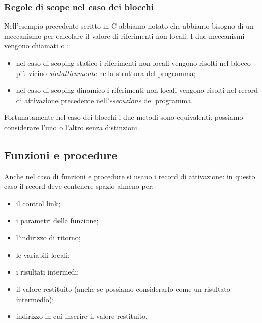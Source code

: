 \subsubsection*{Regole di scope nel caso dei blocchi}

Nell'esempio precedente scritto in C abbiamo notato che abbiamo bisogno di un meccanismo per calcolare il valore di riferimenti non locali. I due meccanismi vengono chiamati  o :
\begin{itemize}
    \item nel caso di scoping statico i riferimenti non locali vengono risolti nel blocco più vicino \emph{sintatticamente} nella struttura del programma;
    \item nel caso di scoping dinamico i riferimenti non locali vengono risolti nel record di attivazione precedente nell'\emph{esecuzione} del programma.
\end{itemize}

Fortunatamente nel caso dei blocchi i due metodi sono equivalenti: possiamo considerare l'uno o l'altro senza distinzioni.

\subsection{Funzioni e procedure}

Anche nel caso di funzioni e procedure si usano i record di attivazione: in questo caso il record deve contenere spazio almeno per:
\begin{itemize}
    \item il control link;
    \item i parametri della funzione;
    \item l'indirizzo di ritorno;
    \item le variabili locali;
    \item i risultati intermedi;
    \item il valore restituito (anche se possiamo considerarlo come un risultato intermedio);
    \item indirizzo in cui inserire il valore restituito.
\end{itemize}

